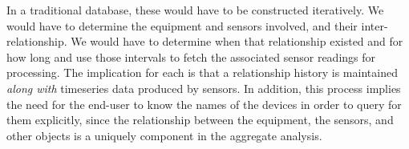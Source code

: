In a traditional database, these would have to be constructed iteratively.  We would have to determine the equipment and sensors involved, 
and their inter-relationship.  We would have to determine when that relationship existed and for how long and use those intervals 
to fetch the associated sensor readings for processing.  The implication for each is that a relationship history is maintained \emph{along with}
timeseries data produced by sensors.  In addition, this process implies the need for the end-user to know the names of the devices in order
to query for them explicitly, since the relationship between the equipment, the sensors, and other objects is a uniquely component in
the aggregate analysis.